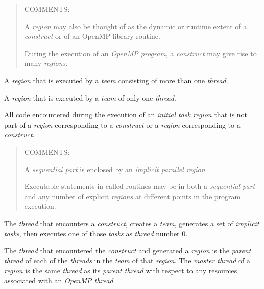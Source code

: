 \begin{quote}
COMMENTS:

A \emph{region} may also be thought of as the dynamic or runtime extent of a 
\emph{construct} or of an OpenMP library routine.

During the execution of an \emph{OpenMP program}, a \emph{construct} may give 
rise to many \emph{regions}.
\end{quote}
\glossarydefend

\glossarydefstart
A  \emph{region} that is executed by a \emph{team} consisting of more than one 
\emph{thread}.
\glossarydefend

\smallskip
{}
\glossarydefstart
A  \emph{region} that is executed by a \emph{team} of only one \emph{thread}.
\glossarydefend

\glossarydefstart
All code encountered during the execution of an \emph{initial task region} that is not part 
of a  \emph{region} corresponding to a  \emph{construct} or a 
\emph{region} corresponding to a  \emph{construct}.

\begin{quote}
COMMENTS: 

A \emph{sequential part} is enclosed by an \emph{implicit parallel region}.

Executable statements in called routines may be in both a \emph{sequential 
part} and any number of explicit  \emph{regions} at different points 
in the program execution.
\end{quote}
\glossarydefend

\glossarydefstart
The \emph{thread} that encounters a  \emph{construct}, creates a \emph{team}, generates a set 
of \emph{implicit tasks}, then executes one of those \emph{tasks} as \emph{thread} number 0.
\glossarydefend

\glossarydefstart
The \emph{thread} that encountered the  \emph{construct} and generated a 
 \emph{region} is the \emph{parent thread} of each of the 
\emph{threads} in the \emph{team} of that 
 \emph{region}. The \emph{master thread} 
of a  \emph{region} is the same \emph{thread} 
as its \emph{parent thread} with respect to any resources associated with an \emph{OpenMP thread}.
\glossarydefend

